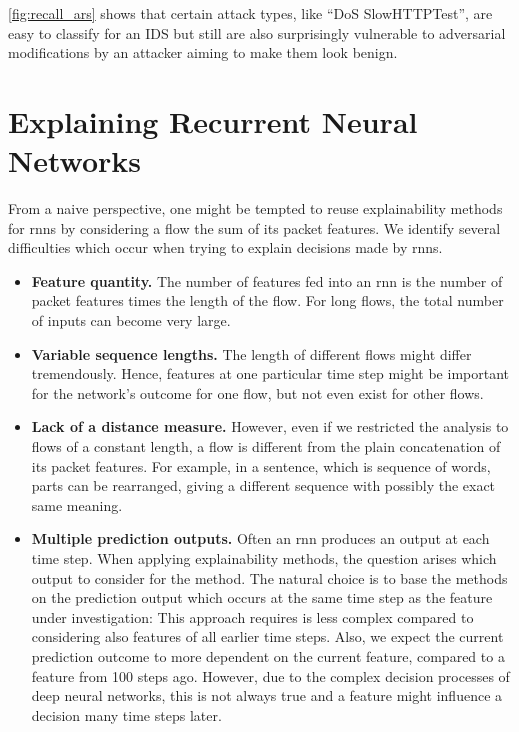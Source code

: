 \documentclass[conference]{IEEEtran}
\begin{document}
\autoref{fig:recall_ars} shows that certain attack types, like ``DoS SlowHTTPTest'', are easy to classify for an IDS but still are also surprisingly vulnerable to adversarial modifications by an attacker aiming to make them look benign.

\section{Explaining Recurrent Neural Networks}
From a naive perspective, one might be tempted to reuse explainability methods for \glspl{rnn} by considering a flow the sum of its packet features.
We identify several difficulties which occur when trying to explain decisions made by \glspl{rnn}.

\begin{itemize}[topsep=0pt,wide,labelwidth=!,labelindent=0pt]
\item
\textbf{Feature quantity.}
The number of features fed into an \gls{rnn} is the number of packet features times the length of the flow. For long flows, the total number of inputs can become very large.

\item
\textbf{Variable sequence lengths.}
The length of different flows might differ tremendously. Hence, features at one particular time step might be important for the network's outcome for one flow, but not even exist for other flows. 

\item
\textbf{Lack of a distance measure.}
However, even if we restricted the analysis to flows of a constant length, a flow is different from the plain concatenation of its packet features.
For example, in a sentence, which is sequence of words, parts can be rearranged, giving a different sequence with possibly the exact same meaning. 

\item
\textbf{Multiple prediction outputs.}
Often an \gls{rnn} produces an output at each time step. When  applying explainability methods, the question arises which output to consider for the method. The natural choice is to base the methods on the prediction output which occurs at the same time step as the feature under investigation: This approach requires is less complex compared to considering also features of all earlier time steps. Also, we expect the current prediction outcome to more dependent on the current feature, compared to a feature from 100 steps ago. 
However, due to the complex decision processes of deep neural networks,
this is not always true and a feature might influence a decision many time steps later. 
\end{itemize}
\end{document}
